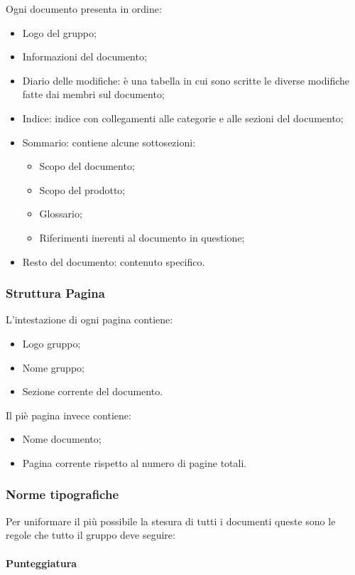 \documentclass{scalatekids-article}
\begin{document}
Ogni documento presenta in ordine:
\begin{itemize}
    \item Logo del gruppo;
    \item Informazioni del documento;
    \item Diario delle modifiche: è una tabella in cui sono scritte le diverse modifiche fatte dai membri sul documento;
    \item Indice: indice con collegamenti alle categorie e alle sezioni del documento;
    \item Sommario: contiene alcune sottosezioni:
        \begin{itemize}
            \item Scopo del documento;
            \item Scopo del prodotto;
            \item Glossario;
            \item Riferimenti inerenti al documento in questione;
        \end{itemize}
    \item Resto del documento: contenuto specifico.
\end{itemize}

\subsubsection{Struttura Pagina}

L'intestazione di ogni pagina contiene:
\begin{itemize}
    \item Logo gruppo;
    \item Nome gruppo;
    \item Sezione corrente del documento.
\end{itemize}
Il piè pagina invece contiene:
\begin{itemize}
    \item Nome documento;
    \item Pagina corrente rispetto al numero di pagine totali.
\end{itemize}

\subsubsection{Norme tipografiche}

Per uniformare il più possibile la stesura di tutti i documenti queste sono le regole che tutto il gruppo deve seguire:

\paragraph{Punteggiatura}
\end{document}
